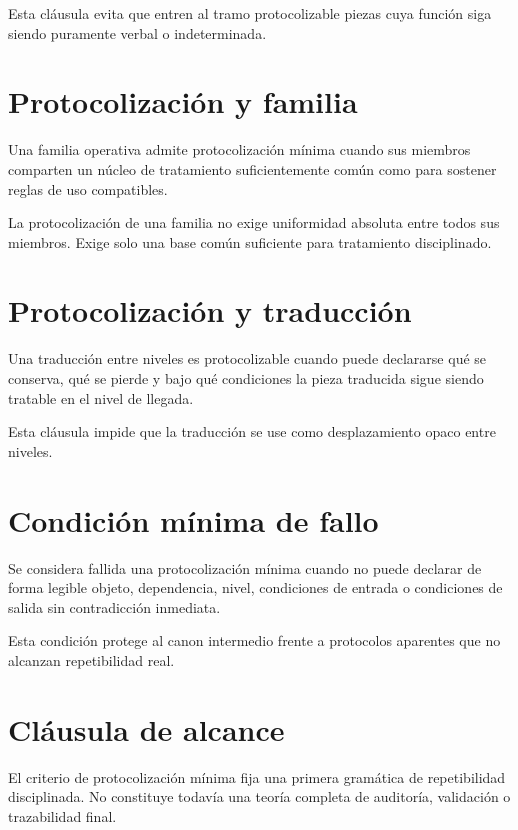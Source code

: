 \begin{observation}
Esta cláusula evita que entren al tramo protocolizable piezas cuya función siga siendo puramente verbal o indeterminada.
\end{observation}

\section{Protocolización y familia}
\begin{definition}
Una familia operativa admite protocolización mínima cuando sus miembros comparten un núcleo de tratamiento suficientemente común como para sostener reglas de uso compatibles.
\end{definition}

\begin{observation}
La protocolización de una familia no exige uniformidad absoluta entre todos sus miembros. Exige solo una base común suficiente para tratamiento disciplinado.
\end{observation}

\section{Protocolización y traducción}
\begin{definition}
Una traducción entre niveles es protocolizable cuando puede declararse qué se conserva, qué se pierde y bajo qué condiciones la pieza traducida sigue siendo tratable en el nivel de llegada.
\end{definition}

\begin{observation}
Esta cláusula impide que la traducción se use como desplazamiento opaco entre niveles.
\end{observation}

\section{Condición mínima de fallo}
\begin{definition}
Se considera fallida una protocolización mínima cuando no puede declarar de forma legible objeto, dependencia, nivel, condiciones de entrada o condiciones de salida sin contradicción inmediata.
\end{definition}

\begin{observation}
Esta condición protege al canon intermedio frente a protocolos aparentes que no alcanzan repetibilidad real.
\end{observation}

\section{Cláusula de alcance}
\begin{observation}
El criterio de protocolización mínima fija una primera gramática de repetibilidad disciplinada. No constituye todavía una teoría completa de auditoría, validación o trazabilidad final.
\end{observation}


